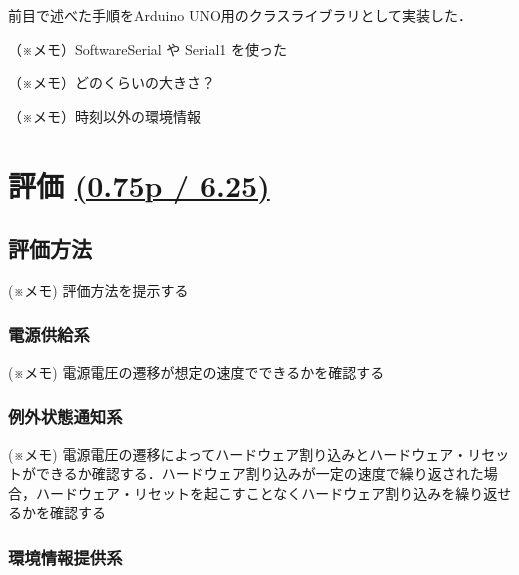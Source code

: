 
前目で述べた手順をArduino UNO用のクラスライブラリとして実装した．

（※メモ）SoftwareSerial や Serial1 を使った

（※メモ）どのくらいの大きさ？



（※メモ）時刻以外の環境情報


\section{評価 \small{\underline{(0.75p / 6.25)}}}
\label{sec:05evaluation}


\subsection{評価方法}

(※メモ) 評価方法を提示する\\

\subsubsection{電源供給系}

(※メモ) 電源電圧の遷移が想定の速度でできるかを確認する\\


\subsubsection{例外状態通知系}

(※メモ) 電源電圧の遷移によってハードウェア割り込みとハードウェア・リセットができるか確認する．ハードウェア割り込みが一定の速度で繰り返された場合，ハードウェア・リセットを起こすことなくハードウェア割り込みを繰り返せるかを確認する


\subsubsection{環境情報提供系}

